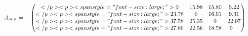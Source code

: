 \documentclass[12pt]{article}
\begin{document}
$ \begin{equation*}    A_{m,n} =     \begin{pmatrix}</p>
<p><span style="font-size: large;">0 &15.98 & 15.80& 5.22\\</p>
<p><span style="font-size: large;">23.78 & 0 &16.91 & 9.31 \\</p>
<p><span style="font-size: large;">37.58 & 25.35 & 0 & 22.07 \\</p>
<p><span style="font-size: large;">27.86 & 22.56 & 18.58 & 0    \end{pmatrix}\end{equation*} $
\end{document}
